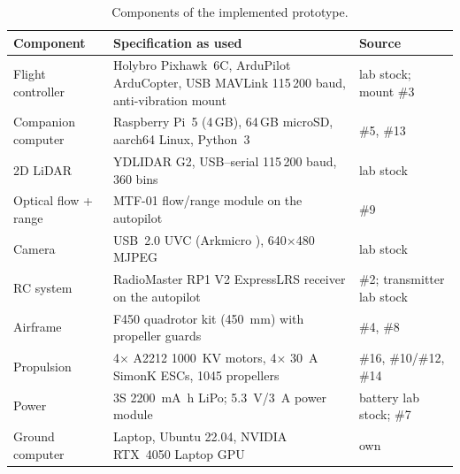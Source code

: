 \begin{table}[H]
\centering\small
\caption{Components of the implemented prototype.}
\label{tab:bom-prototype}
\begin{tabularx}{\textwidth}{p{3.3cm} L p{2.9cm}}
\toprule
\textbf{Component} & \textbf{Specification as used} & \textbf{Source} \\
\midrule
Flight controller & Holybro Pixhawk~6C, ArduPilot ArduCopter, USB MAVLink 115\,200 baud, anti-vibration mount & lab stock; mount \#3 \\
Companion computer & Raspberry Pi~5 (4\,GB), 64\,GB microSD, aarch64 Linux, Python~3 & \#5, \#13 \\
2D LiDAR & YDLIDAR G2, USB--serial 115\,200 baud, 360 bins & lab stock \\
Optical flow + range & MTF-01 flow/range module on the autopilot & \#9 \\
Camera & USB~2.0 UVC (Arkmicro ), 640$\times$480 MJPEG & lab stock \\
RC system & RadioMaster RP1 V2 ExpressLRS receiver on the autopilot & \#2; transmitter lab stock \\
Airframe & F450 quadrotor kit (\SI{450}{\milli\metre}) with propeller guards & \#4, \#8 \\
Propulsion & 4$\times$ A2212 \SI{1000}{KV} motors, 4$\times$ \SI{30}{\ampere} SimonK ESCs, 1045 propellers & \#16, \#10/\#12, \#14 \\
Power & 3S \SI{2200}{\milli\ampere\hour} LiPo; \SI{5.3}{\volt}/\SI{3}{\ampere} power module & battery lab stock; \#7 \\
Ground computer & Laptop, Ubuntu 22.04, NVIDIA RTX~4050 Laptop GPU & own \\
\bottomrule
\end{tabularx}
\end{table}

